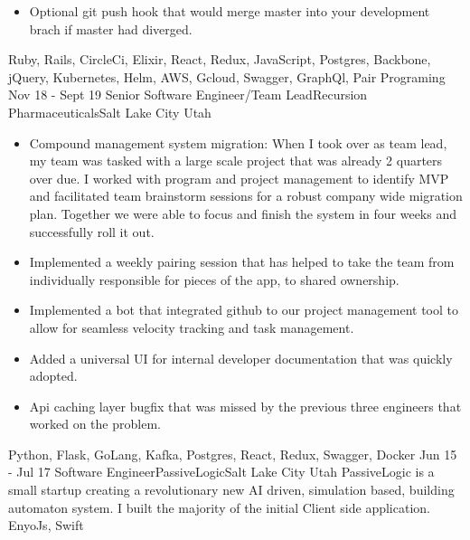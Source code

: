 \begin{experiences}
{\begin{itemize}
                        \item Optional git push hook that would merge master into your development brach if master had diverged.
                      \end{itemize}
                    }
                    {Ruby, Rails, CircleCi, Elixir, React, Redux, JavaScript, Postgres, Backbone, jQuery, Kubernetes, Helm, AWS, Gcloud, Swagger, GraphQl, Pair Programing}
  \emptySeparator
  \experience
    {Nov 18 - Sept 19} {Senior Software Engineer/Team Lead}{Recursion Pharmaceuticals}{Salt Lake City Utah}
    {}    {
                      \begin{itemize}
                        \item Compound management system migration:
                        When I took over as team lead, my team was tasked with a large scale project that was already 2 quarters over due. I worked with program and project management to identify MVP and facilitated team brainstorm sessions for a robust company wide migration plan. Together we were able to focus and finish the system in four weeks and successfully roll it out.
                        \item Implemented a weekly pairing session that has helped to take the team from individually responsible for pieces of the app, to shared ownership.
                        \item Implemented a bot that integrated github to our project management tool to allow for seamless velocity tracking and task management.
                        \item Added a universal UI for internal developer documentation that was quickly adopted.
                        \item Api caching layer bugfix that was missed by the previous three engineers that worked on the problem.
                      \end{itemize}
                    }
                    {Python, Flask, GoLang, Kafka, Postgres, React, Redux, Swagger, Docker}
  \emptySeparator
  \experience
  {Jun 15 - Jul 17}  {Software Engineer}{PassiveLogic}{Salt Lake City Utah}
  {}  {PassiveLogic is a small startup creating a revolutionary new AI driven, simulation based, building automaton system. I built the majority of the initial Client side application.}
      {EnyoJs, Swift}
  \emptySeparator
\end{experiences}

